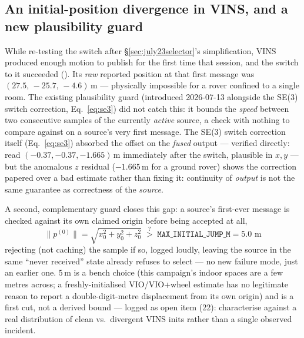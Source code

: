 \subsection{An initial-position divergence in VINS, and a new plausibility
guard}
\label{sec:july23guard}
While re-testing the switch after \S\ref{sec:july23selector}'s
simplification, VINS produced enough motion to publish for the first time
that session, and the switch to it succeeded
(). Its \emph{raw} reported position at
that first message was $(27.5,\,-25.7,\,-4.6)$\,m — physically impossible
for a rover confined to a single room. The existing plausibility guard
(introduced 2026-07-13 alongside the SE(3) switch correction,
Eq.~\ref{eq:se3}) did not catch this: it bounds the \emph{speed} between two
consecutive samples of the currently \emph{active} source, a check with
nothing to compare against on a source's very first message. The SE(3)
switch correction itself (Eq.~\ref{eq:se3}) absorbed the offset on the
\emph{fused} output —
verified directly:  read $(-0.37,-0.37,-1.665)$\,m
immediately after the switch, plausible in $x,y$ — but the anomalous $z$
residual ($-1.665$\,m for a ground rover) shows the correction papered over
a bad estimate rather than fixing it: continuity of \emph{output} is not
the same guarantee as correctness of the \emph{source}.

A second, complementary guard closes this gap: a source's first-ever
message is checked against its own claimed origin before being accepted at
all,
\begin{equation}
  \lVert p^{(0)} \rVert = \sqrt{x_0^2+y_0^2+z_0^2} \; \overset{?}{>} \;
  \texttt{MAX\_INITIAL\_JUMP\_M} = 5.0\text{ m}
  \label{eq:initguard}
\end{equation}
rejecting (not caching) the sample if so, logged loudly, leaving the source
in the same ``never received'' state  already refuses
to select — no new failure mode, just an earlier one. $5$\,m is a bench
choice (this campaign's indoor spaces are a few metres across; a
freshly-initialised VIO/VIO+wheel estimate has no legitimate reason to
report a double-digit-metre displacement from its own origin) and is a
first cut, not a derived bound — logged as open item (22): characterise
against a real distribution of clean vs.\ divergent VINS inits rather than
a single observed incident.

